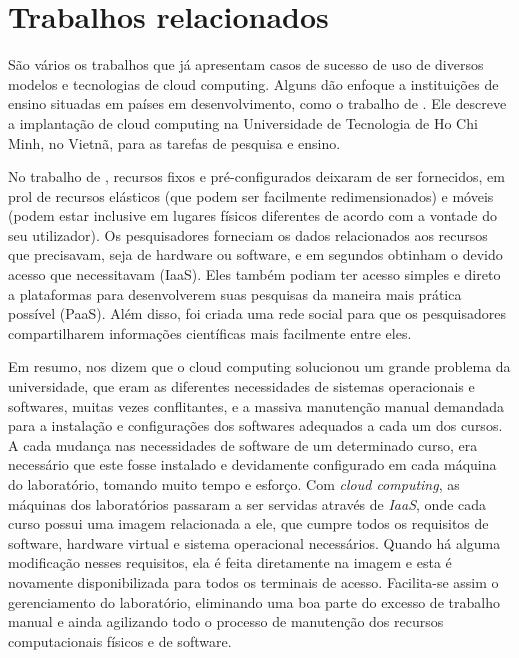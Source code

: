 \chapter{Trabalhos relacionados}

São vários os trabalhos que já apresentam casos de sucesso de uso de diversos
modelos e tecnologias de cloud computing. Alguns dão enfoque a instituições de
ensino situadas em países em desenvolvimento, como o trabalho de
. Ele descreve a implantação
de cloud computing na Universidade de Tecnologia de Ho Chi Minh, no Vietnã,
para as tarefas de pesquisa e ensino.

No trabalho de ,
recursos fixos e pré-configurados deixaram de ser fornecidos,
em prol de recursos elásticos (que podem ser facilmente redimensionados)
e móveis (podem estar inclusive em lugares físicos diferentes de acordo com a
vontade do seu utilizador). Os pesquisadores forneciam os dados
relacionados aos recursos que precisavam, seja de hardware ou software, e em
segundos obtinham o devido acesso que necessitavam (IaaS). Eles também podiam
ter acesso simples e direto a plataformas para desenvolverem suas pesquisas da
maneira mais prática possível (PaaS). Além disso, foi criada uma rede social
para que os pesquisadores compartilharem informações científicas mais facilmente
entre eles.

Em resumo,  nos dizem que
o cloud computing solucionou um grande problema da
universidade, que eram as diferentes necessidades de sistemas operacionais e softwares,
muitas vezes conflitantes, e a massiva manutenção manual demandada para a
instalação e configurações dos softwares adequados a cada um dos cursos. A cada
mudança nas necessidades de software de um determinado curso, era necessário que
este fosse instalado e devidamente configurado em cada máquina do laboratório,
tomando muito tempo e esforço.
Com \emph{cloud computing}, as máquinas dos laboratórios passaram a ser servidas
através de \emph{IaaS}, onde cada curso possui uma imagem
relacionada a ele, que cumpre todos os requisitos de software, hardware virtual
e sistema operacional necessários. Quando há alguma modificação nesses
requisitos, ela é feita diretamente na imagem e esta é novamente disponibilizada
para todos os terminais de acesso. Facilita-se assim o gerenciamento do
laboratório, eliminando uma boa parte do excesso de trabalho manual e ainda
agilizando todo o processo de manutenção dos recursos computacionais físicos e
de software.

